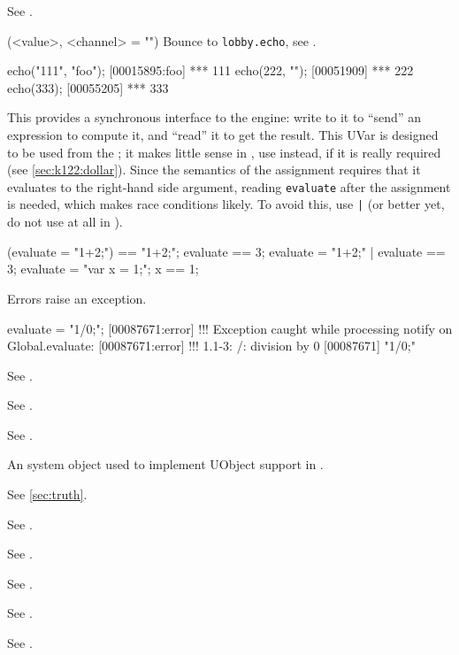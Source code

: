 \begin{urbiscriptapi}
\item[Duration] See .

\item[echo](<value>, <channel> = "")%
  Bounce to \lstinline|lobby.echo|, see .
\begin{urbiscript}
echo("111", "foo");
[00015895:foo] *** 111
echo(222, "");
[00051909] *** 222
echo(333);
[00055205] *** 333
\end{urbiscript}

\item[evaluate] This  provides a synchronous interface
  to the \urbi engine: write to it to ``send'' an expression to
  compute it, and ``read'' it to get the result.  This UVar is
  designed to be used from the \Cxx; it makes little sense in \us, use
   instead, if it is really required (see
  \autoref{sec:k122:dollar}).  Since the semantics of the assignment
  requires that it evaluates to the right-hand side argument, reading
  \lstinline|evaluate| after the assignment is needed, which makes
  race conditions likely.  To avoid this, use \lstinline{|} (or better
  yet, do not use  at all in \us).

\begin{urbiassert}
(evaluate = "1+2;") == "1+2;";
 evaluate == 3;
{ evaluate = "1+2;" | evaluate } == 3;
{ evaluate = "var x = 1;"; x } == 1;
\end{urbiassert}

  Errors raise an exception.

\begin{urbiscript}
evaluate = "1/0;";
[00087671:error] !!! Exception caught while processing notify on Global.evaluate:
[00087671:error] !!! 1.1-3: /: division by 0
[00087671] "1/0;"
\end{urbiscript}

\item[Event] See .
\item[Exception] See .
\item[Executable] See .
\item[external] An system object used to implement UObject support in
  \us.
\item[false]  See \autoref{sec:truth}.
\item[File] See .
\item[Finalizable] See .
\item[Float] See .
\item[FormatInfo] See .
\item[Formatter] See .


\end{urbiscriptapi}
